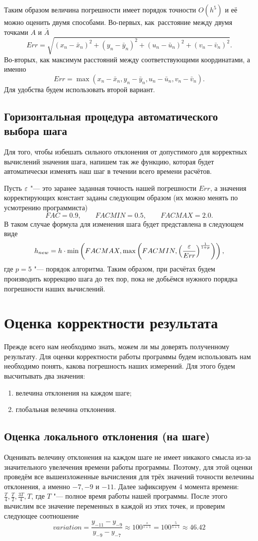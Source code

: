 \documentclass[a4paper,14pt]{article}
\begin{document}
Таким образом величина погрешности имеет порядок точности $O(h^5)$ и её можно оценить двумя способами. Во-первых, как~расстояние между двумя точками $A$ и $\bar A$
\[
Err = \sqrt{(x_n - \bar x_n)^2 + (y_n - \bar y_n)^2 + (u_n - \bar u_n)^2 + (v_n - \bar v_n)^2}. 
\]
Во-вторых, как максимум расстояний между соответствующими координатами, а именно
\[
Err = \max \left( x_n - \bar x_n,y_n - \bar y_n, u_n - \bar u_n, v_n - \bar v_n \right). 
\]
Для удобства будем использовать второй вариант.
\subsection{Горизонтальная процедура автоматического выбора шага}
Для того, чтобы избешать сильного отклонения от допустимого для корректных вычислений значения шага, напишем так же функцию, которая будет автоматически изменять наш шаг в течении всего времени расчётов.

Пусть $\varepsilon$ "--- это заранее заданная точность нашей погрешности $Err$, 
а значения корректирующих констант заданы следующим образом (их можно менять по усмотрению программиста)  
\[
FAC = 0.9, \qquad FACMIN = 0.5,\qquad FACMAX = 2.0.
\]
В таком случае формула для изменения шага будет представлена в следующем виде
\[
h_{new} = h \cdot \min \left(FACMAX, \max \left(FACMIN, \left(\frac{\varepsilon}{Err} \right)^{\frac{1}{1 + p}} \right)\right),
\]
где $p = 5$ "--- порядок алгоритма.
Таким образом, при расчётах будем производить коррекцию шага до тех пор, пока не добьёмся нужного порядка погрешности наших вычислений.
\section{Оценка корректности результата}
Прежде всего нам необходимо знать, можем ли мы доверять полученному результату. Для оценки корректности работы программы будем использовать нам необходимо понять, какова погрешность наших измерений. Для этого будем высчитывать два значения:
\begin{enumerate}
\item велечина отклонения на каждом шаге;
\item глобальная велечина отклонения.
\end{enumerate}
\subsection{Оценка локального отклонения (на шаге)}
Оценивать велечину отклонения на каждом шаге не имеет никакого смысла из-за значительного увелечения времени работы программы. Поэтому, для этой оценки проведём все вышеизложенные вычисления для трёх значений точности велечины отклонения, а именно $-7, -9$ и $-11$. Далее зафиксируем 4 момента времени: $\frac{T}{4}, \frac{T}{2}, \frac{3T}{4}, T$, где $T$ "--- полное время работы нашей программы. После этого вычислим все значение переменных в каждой из этих точек, и проверим следующее соотношение
\[
variation = \frac{y_{-11} - y_{-9}}{y_{-9} - y_{-7}} \approx 100^{\frac{s}{s+1}} = 100^{\frac{5}{5+1}} \approx  46.42 
\]
\end{document}
